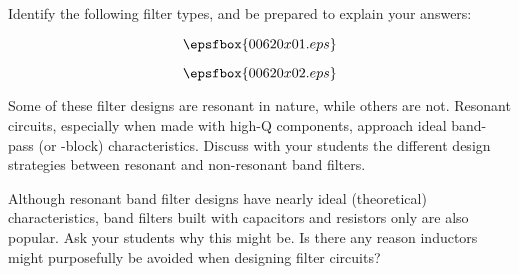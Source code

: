 

Identify the following filter types, and be prepared to explain your answers:

$$\epsfbox{00620x01.eps}$$







$$\epsfbox{00620x02.eps}$$







Some of these filter designs are resonant in nature, while others are not.  Resonant circuits, especially when made with high-Q components, approach ideal band-pass (or -block) characteristics.  Discuss with your students the different design strategies between resonant and non-resonant band filters.  

Although resonant band filter designs have nearly ideal (theoretical) characteristics, band filters built with capacitors and resistors only are also popular.  Ask your students why this might be.  Is there any reason inductors might purposefully be avoided when designing filter circuits?




